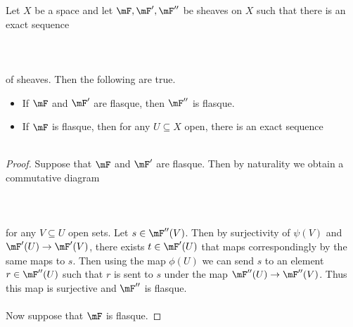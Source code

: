 \documentclass[a4paper]{article}
\begin{document}
\begin{lmm}{}{} Let $X$ be a space and let $\mF,\mF',\mF''$ be sheaves on $X$ such that there is an exact sequence \\~\\
\\~\\
of sheaves. Then the following are true. 
\begin{itemize}
\item If $\mF$ and $\mF'$ are flasque, then $\mF''$ is flasque. 
\item If $\mF$ is flasque, then for any $U\subseteq X$ open, there is an exact sequence \\~\\
\end{itemize}\tcbline
\begin{proof}
Suppose that $\mF$ and $\mF'$ are flasque. Then by naturality we obtain a commutative diagram \\~\\
\\~\\
for any $V\subseteq U$ open sets. Let $s\in\mF''(V)$. Then by surjectivity of $\psi(V)$ and $\mF'(U)\to\mF'(V)$, there exists $t\in\mF'(U)$ that maps correspondingly by the same maps to $s$. Then using the map $\phi(U)$ we can send $s$ to an element $r\in\mF''(U)$ such that $r$ is sent to $s$ under the map $\mF''(U)\to\mF''(V)$. Thus this map is surjective and $\mF''$ is flasque. \\~\\

Now suppose that $\mF$ is flasque. 
\end{proof}
\end{lmm}
\end{document}
